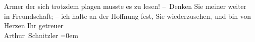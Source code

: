\begin{ledgroupsized}[t]{13cm}
                    Armer der sich trotzdem plagen musste es zu lesen!\pend
           \pstart
           – Denken Sie meiner weiter in Freundschaft; – ich halte an der Hoffnung fest, Sie
                    wiederzusehen, und bin von Herzen\pend
           \pstart
           Ihr getreuer{\\[\baselineskip]}\spacefill\mbox{Arthur Schnitzler}\pend
           \leftskip=0em{}\endnumbering{}\end{ledgroupsized}  \newcommand{\dateiname}{L02353}\newcommand{\titel}{Arthur Schnitzler an Georg Brandes, 16. 8. 1920}\newcommand{\editorInnen}{Martin Anton Müller und Gerd-Hermann Susen}
      